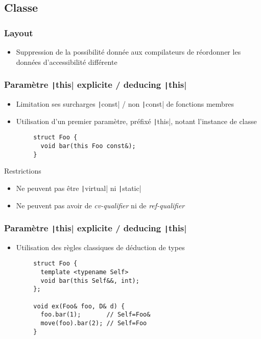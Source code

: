 \documentclass[C++.tex]{subfiles}
\begin{document}
\subsection*{Classe}
\begin{frame}[fragile]
	\frametitle{Layout}
	\begin{itemize}
		\item Suppression de la possibilité donnée aux compilateurs de réordonner les données d'accessibilité différente
	\end{itemize}

\end{frame}

\begin{frame}[fragile]
	\frametitle{Paramètre \texttt|this| explicite / deducing \texttt|this|}
	\begin{itemize}
		\item Limitation ses surcharges \texttt|const| / non \texttt|const| de fonctions membres
		\item Utilisation d'un premier paramètre, préfixé \texttt|this|, notant l'instance de classe
	\end{itemize}

	\begin{verbatim}
		struct Foo {
		  void bar(this Foo const&);
		}
	\end{verbatim}

	\begin{alertblock}{Restrictions}
		\begin{itemize}
			\item Ne peuvent pas être \texttt|virtual| ni \texttt|static|
			\item Ne peuvent pas avoir de \textit{cv-qualifier} ni de \textit{ref-qualifier}
		\end{itemize}
	\end{alertblock}

\end{frame}

\begin{frame}[fragile]
	\frametitle{Paramètre \texttt|this| explicite / deducing \texttt|this|}
	\begin{itemize}
		\item Utilisation des règles classiques de déduction de types 
	\end{itemize}

	\begin{verbatim}
		struct Foo {
		  template <typename Self>
		  void bar(this Self&&, int);
		};

		void ex(Foo& foo, D& d) {
		  foo.bar(1);       // Self=Foo&
		  move(foo).bar(2); // Self=Foo
		}
	\end{verbatim}
\end{frame}
\end{document}
